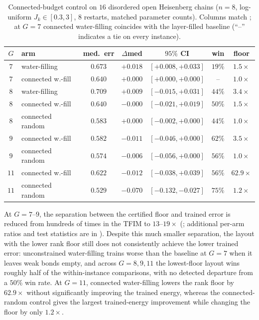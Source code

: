 \documentclass[reprint,aps,pra,floatfix,superscriptaddress,nofootinbib,longbibliography]{revtex4-2}
\theoremstyle{remark}
\theoremstyle{definition}
\begin{document}
\begin{table}[t]
\centering
\caption{Connected-budget control on $16$ disordered open Heisenberg chains
($n=8$, log-uniform $J_k\in[0.3,3]$, $8$ restarts, matched parameter counts).
Columns match ; at $G=7$ connected water-filling coincides
with the layer-filled baseline (``--'' indicates a tie on every instance).}
\label{tab:heisenberg}
{\scriptsize\setlength{\tabcolsep}{2.0pt}
\begin{tabular}{clccccc}
\toprule
$G$ & arm & med.\ err & $\Delta$med & $95\%$ CI & win & floor\\
\midrule
$7$  & water-filling     & $0.673$ & $+0.018$ & $[+0.008,+0.033]$ & $19\%$ & $1.5\times$\\
$7$  & connected w.-fill & $0.640$ & $+0.000$ & $[+0.000,+0.000]$ & --     & $1.0\times$\\
\midrule
$8$  & water-filling     & $0.709$ & $+0.009$ & $[-0.015,+0.031]$ & $44\%$ & $3.4\times$\\
$8$  & connected w.-fill & $0.640$ & $-0.000$ & $[-0.021,+0.019]$ & $50\%$ & $1.5\times$\\
$8$  & connected random  & $0.583$ & $+0.000$ & $[-0.002,+0.000]$ & $44\%$ & $1.0\times$\\
\midrule
$9$  & connected w.-fill & $0.582$ & $-0.011$ & $[-0.046,+0.000]$ & $62\%$ & $3.5\times$\\
$9$  & connected random  & $0.574$ & $-0.006$ & $[-0.056,+0.000]$ & $56\%$ & $1.0\times$\\
\midrule
$11$ & connected w.-fill & $0.622$ & $-0.012$ & $[-0.038,+0.039]$ & $56\%$ & $62.9\times$\\
$11$ & connected random  & $0.529$ & $-0.070$ & $[-0.132,-0.027]$ & $75\%$ & $1.2\times$\\
\bottomrule
\end{tabular}}
\end{table}

At $G=7$--$9$, the separation between the certified floor and trained error
is reduced from hundreds of times in the TFIM to $13$--$19\times$ (; additional per-arm ratios and test
statistics are in ). Despite this much smaller separation,
the layout with the lower rank floor still does not consistently achieve the
lower trained error: unconstrained water-filling trains worse than the baseline
at $G=7$ when it leaves weak bonds empty, and across $G=8,9,11$ the lowest-floor
layout wins roughly half of the within-instance comparisons, with no detected departure from a $50\%$ win rate. At $G=11$, connected water-filling lowers the rank floor by
$62.9\times$ without significantly improving the trained energy, whereas the
connected-random control gives the largest trained-energy improvement while
changing the floor by only $1.2\times$.
\end{document}
